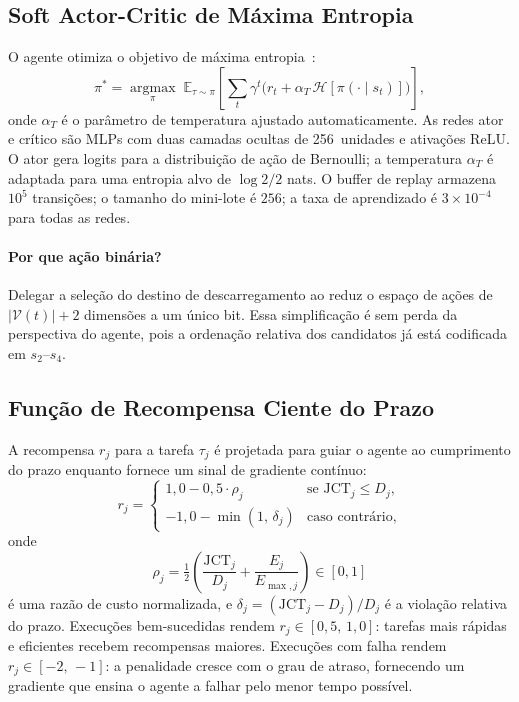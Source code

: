 \subsection{Soft Actor-Critic de Máxima Entropia}
\label{sec:sac}

O agente  otimiza o objetivo de máxima entropia~\cite{haarnoja2018sac}:
\begin{equation}
  \pi^* = \operatorname*{argmax}_\pi\;
  \mathbb{E}_{\tau \sim \pi}\!\left[
    \sum_{t} \gamma^t \bigl(r_t + \alpha_T\,\mathcal{H}[\pi(\cdot\mid s_t)]\bigr)
  \right],
  \label{eq:sac_obj}
\end{equation}
onde $\alpha_T$ é o parâmetro de temperatura ajustado automaticamente.
As redes ator e crítico são MLPs com duas camadas ocultas de 256~unidades e
ativações ReLU.
O ator gera logits para a distribuição de ação de Bernoulli; a temperatura
$\alpha_T$ é adaptada para uma entropia alvo de $\log 2 / 2$ nats.
O buffer de replay armazena $10^5$ transições; o tamanho do mini-lote é $256$;
a taxa de aprendizado é $3 \times 10^{-4}$ para todas as redes.

\paragraph{Por que ação binária?} Delegar a seleção do destino de descarregamento ao  reduz o espaço de ações de $|\mathcal{V}(t)| + 2$ dimensões a um único bit. Essa simplificação é sem perda da perspectiva do agente, pois a ordenação relativa dos candidatos já está codificada em $s_2$--$s_4$.

\subsection{Função de Recompensa Ciente do Prazo}
\label{sec:reward}

A recompensa $r_j$ para a tarefa $\tau_j$ é projetada para guiar o agente ao
cumprimento do prazo enquanto fornece um sinal de gradiente contínuo:
\begin{equation}
  r_j = \begin{cases}
    1{,}0 - 0{,}5 \cdot \rho_j        & \text{se } \mathrm{JCT}_j \le D_j, \\
    -1{,}0 - \min(1,\,\delta_j)       & \text{caso contrário,}
  \end{cases}
  \label{eq:reward}
\end{equation}
onde
\begin{equation}
  \rho_j = \tfrac{1}{2}\!\left(\frac{\mathrm{JCT}_j}{D_j}
                              + \frac{E_j}{E_{\max,j}}\right) \in [0,1]
  \label{eq:rho}
\end{equation}
é uma razão de custo normalizada, e $\delta_j = (\mathrm{JCT}_j - D_j)/D_j$
é a violação relativa do prazo.
Execuções bem-sucedidas rendem $r_j \in [0{,}5,\,1{,}0]$: tarefas mais rápidas
e eficientes recebem recompensas maiores.
Execuções com falha rendem $r_j \in [-2,\,-1]$: a penalidade cresce com o
grau de atraso, fornecendo um gradiente que ensina o agente a
falhar pelo menor tempo possível.
